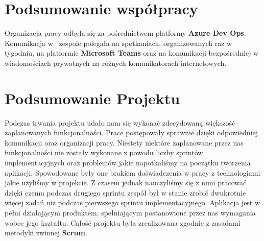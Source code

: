 \documentclass[10pt, a4paper]{report}
\begin{document}
\section{Podsumowanie współpracy}
Organizacja pracy odbyła się za pośrednictwem platformy \textbf{Azure Dev Ops}. Komunikacja w~ zespole polegała 
na spotkaniach, organizowanych raz w tygodniu, na platformie \textbf{Microsoft Teams} oraz na komunikacji bezpośredniej w wiadomościach prywatnych
 na różnych komunikatorach internetowych.

\section{Podsumowanie Projektu}
Podczas trwania projektu udało nam się wykonać zdecydowaną większość zaplanowanych funkcjonalności.
Prace postępowały sprawnie dzięki odpowiedniej komunikacji oraz organizacji pracy. Niestety niektóre
zaplanowane przez nas funkcjonalności nie zostały wykonane z powodu liczby sprintów implementacyjnych oraz 
problemów jakie napotkaliśmy na początku tworzenia aplikacji. Spowodowane były one brakiem doświadczenia w pracy z
 technologiami jakie użyliśmy w projekcie. Z czasem jednak nauczyliśmy się z nimi pracować dzięki czemu podczas drugiego
 sprintu zespół był w stanie zrobić dwukrotnie więcej zadań niż podczas pierwszego sprintu implementacyjnego.
Aplikacja jest w pełni działającym produktem, spełniającym postanowione przez nas wymagania wobec jego kształtu.
Całość projektu była zrealizowana zgodnie z zasadami metodyki zwinnej \textbf{Scrum}.
\end{document}

